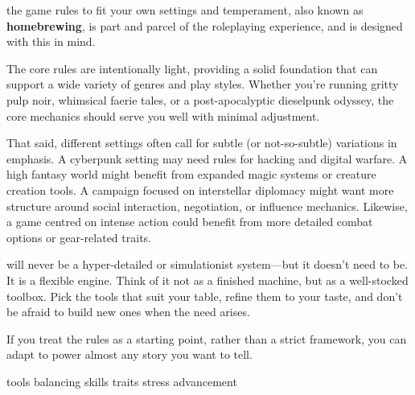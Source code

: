 
 the game rules to fit your own settings and temperament, also known as \textbf{homebrewing}, is part and parcel of the roleplaying experience, and \wyrd is designed with this in mind.  

The core rules are intentionally light, providing a solid foundation that can support a wide variety of genres and play styles. Whether you're running gritty pulp noir, whimsical faerie tales, or a post-apocalyptic dieselpunk odyssey, the core mechanics should serve you well with minimal adjustment.

That said, different settings often call for subtle (or not-so-subtle) variations in emphasis. A cyberpunk setting may need rules for hacking and digital warfare. A high fantasy world might benefit from expanded magic systems or creature creation tools. A campaign focused on interstellar diplomacy might want more structure around social interaction, negotiation, or influence mechanics. Likewise, a game centred on intense action could benefit from more detailed combat options or gear-related traits.

\wyrd will never be a hyper-detailed or simulationist system—but it doesn't need to be. It is a flexible engine. Think of it not as a finished machine, but as a well-stocked toolbox. Pick the tools that suit your table, refine them to your taste, and don't be afraid to build new ones when the need arises. 

If you treat the rules as a starting point, rather than a strict framework, you can adapt \wyrd to power almost any story you want to tell.


{tools}
{balancing}
{skills}
{traits}
{stress}
{advancement}




